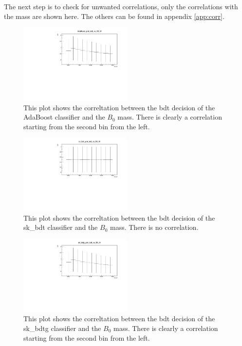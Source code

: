 \documentclass[english]{uzhpub}
\begin{document}
The next step is to check for unwanted correlations, only the correlations with the mass are shown here. The others can be found in appendix \ref{app:corr}.
\begin{figure}[H]
 \centering
 \includegraphics[width=0.5\textwidth]{plots/AdaBoost_plot_bdt_vs_B0_M}
 \caption{This plot shows the correltation between the bdt decision of the AdaBoost classifier and the $B_0$ mass. There is clearly a correlation starting from the second bin from the left.}
 \label{fig:AdaB0M}
\end{figure}

\begin{figure}[H]
 \centering
 \includegraphics[width=0.5\textwidth]{plots/sk_bdt_plot_bdt_vs_B0_M}
 \caption{This plot shows the correltation between the bdt decision of the sk\_bdt classifier and the $B_0$ mass. There is no correlation.}
 \label{fig:skbdtB0M}
\end{figure}

\begin{figure}[H]
 \centering
 \includegraphics[width=0.5\textwidth]{plots/sk_bdtg_plot_bdt_vs_B0_M}
 \caption{This plot shows the correltation between the bdt decision of the sk\_bdtg classifier and the $B_0$ mass. There is clearly a correlation starting from the second bin from the left.}
 \label{fig:skbdtgB0M}
\end{figure}
\end{document}
